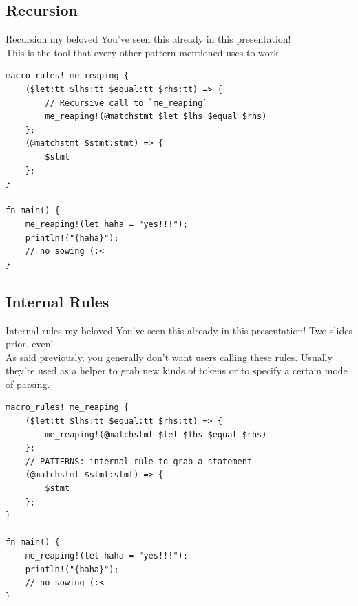 \documentclass{beamer}
\begin{document}
	\subsection{Recursion}
	\begin{frame}[fragile]{Recursion my beloved}
		You've seen this already in this presentation! \\

		This is the tool that every other pattern mentioned uses to work.

		\begin{verbatim}
macro_rules! me_reaping {
	($let:tt $lhs:tt $equal:tt $rhs:tt) => {
		// Recursive call to `me_reaping`
		me_reaping!(@matchstmt $let $lhs $equal $rhs)
	};
	(@matchstmt $stmt:stmt) => {
		$stmt
	};
}

fn main() {
	me_reaping!(let haha = "yes!!!");
	println!("{haha}");
	// no sowing (:<
}
		\end{verbatim}
	\end{frame}

	\subsection{Internal Rules}
	\begin{frame}[fragile]{Internal rules my beloved}
		You've seen this already in this presentation! Two slides prior, even! \\

		As said previously, you generally don't want users calling these rules. Usually they're used
		as a helper to grab new kinds of tokens or to specify a certain mode of parsing.

		\begin{verbatim}
macro_rules! me_reaping {
	($let:tt $lhs:tt $equal:tt $rhs:tt) => {
		me_reaping!(@matchstmt $let $lhs $equal $rhs)
	};
	// PATTERNS: internal rule to grab a statement
	(@matchstmt $stmt:stmt) => {
		$stmt
	};
}

fn main() {
	me_reaping!(let haha = "yes!!!");
	println!("{haha}");
	// no sowing (:<
}
		\end{verbatim}
	\end{frame}
\end{document}
